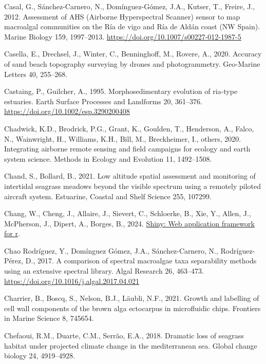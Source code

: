 \documentclass[
  letterpaper,
  11pt,
  english,
  singlespacing,
  headsepline]{MastersDoctoralThesis}
\newlength{\cslhangindent}
\newenvironment{CSLReferences}[2] %
 {\begin{list}{}{%
  \setlength{\itemindent}{0pt}
  \setlength{\leftmargin}{0pt}
  \setlength{\parsep}{0pt}
  \ifodd #1
   \setlength{\leftmargin}{\cslhangindent}
   \setlength{\itemindent}{-1\cslhangindent}
  \fi
  \setlength{\itemsep}{#2\baselineskip}}}
 {\end{list}}
\begin{document}
\begin{CSLReferences}{1}{0}
Casal, G., Sánchez-Carnero, N., Domínguez-Gómez, J.A., Kutser, T.,
Freire, J., 2012. {Assessment of AHS (Airborne Hyperspectral Scanner)
sensor to map macroalgal communities on the R{í}a de vigo and R{í}a de
Ald{á}n coast (NW Spain)}. Marine Biology 159, 1997--2013.
\url{https://doi.org/10.1007/s00227-012-1987-5}

Casella, E., Drechsel, J., Winter, C., Benninghoff, M., Rovere, A.,
2020. Accuracy of sand beach topography surveying by drones and
photogrammetry. Geo-Marine Letters 40, 255--268.

Castaing, P., Guilcher, A., 1995. Morphosedimentary evolution of
ria-type estuaries. Earth Surface Processes and Landforms 20, 361--376.
\url{https://doi.org/10.1002/esp.3290200408}

Chadwick, K.D., Brodrick, P.G., Grant, K., Goulden, T., Henderson, A.,
Falco, N., Wainwright, H., Williams, K.H., Bill, M., Breckheimer, I.,
others, 2020. Integrating airborne remote sensing and field campaigns
for ecology and earth system science. Methods in Ecology and Evolution
11, 1492--1508.

Chand, S., Bollard, B., 2021. Low altitude spatial assessment and
monitoring of intertidal seagrass meadows beyond the visible spectrum
using a remotely piloted aircraft system. Estuarine, Coastal and Shelf
Science 255, 107299.

Chang, W., Cheng, J., Allaire, J., Sievert, C., Schloerke, B., Xie, Y.,
Allen, J., McPherson, J., Dipert, A., Borges, B., 2024.
\href{https://CRAN.R-project.org/package\%20=\%20shiny}{Shiny: Web
application framework for r}.

Chao Rodríguez, Y., Domínguez Gómez, J.A., Sánchez-Carnero, N.,
Rodríguez-Pérez, D., 2017. {A comparison of spectral macroalgae taxa
separability methods using an extensive spectral library}. Algal
Research 26, 463--473. \url{https://doi.org/10.1016/j.algal.2017.04.021}

Charrier, B., Boscq, S., Nelson, B.J., Läubli, N.F., 2021. Growth and
labelling of cell wall components of the brown alga ectocarpus in
microfluidic chips. Frontiers in Marine Science 8, 745654.

Chefaoui, R.M., Duarte, C.M., Serrão, E.A., 2018. Dramatic loss of
seagrass habitat under projected climate change in the mediterranean
sea. Global change biology 24, 4919--4928.


\end{CSLReferences}
\end{document}
